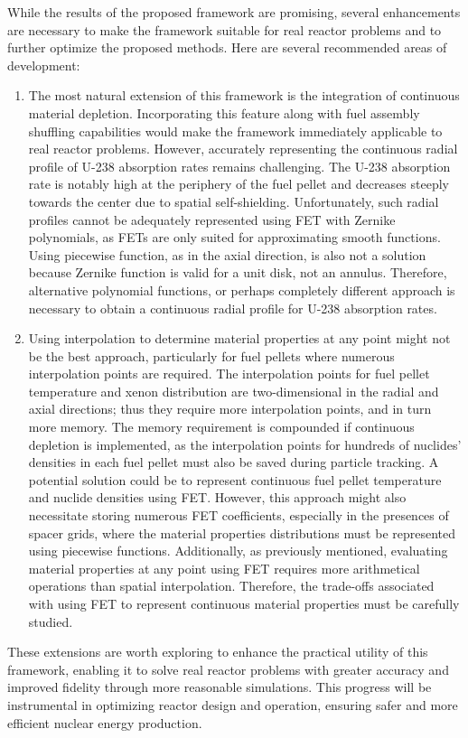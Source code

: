 While the results of the proposed framework are promising, several enhancements are necessary to make the framework suitable for real reactor problems and to further optimize the proposed methods. Here are several recommended areas of development:
\begin{enumerate}
    \item The most natural extension of this framework is the integration of continuous material depletion. Incorporating this feature along with fuel assembly shuffling capabilities would make the framework immediately applicable to real reactor problems. However, accurately representing the continuous radial profile of U-238 absorption rates remains challenging. The U-238 absorption rate is notably high at the periphery of the fuel pellet and decreases steeply towards the center due to spatial self-shielding. Unfortunately, such radial profiles cannot be adequately represented using FET with Zernike polynomials, as FETs are only suited for approximating smooth functions. Using piecewise function, as in the axial direction, is also not a solution because Zernike function is valid for a unit disk, not an annulus. Therefore, alternative polynomial functions, or perhaps completely different approach is necessary to obtain a continuous radial profile for U-238 absorption rates.

    \item Using interpolation to determine material properties at any point  might not be the best approach, particularly for fuel pellets where numerous interpolation points are required. The interpolation points for fuel pellet temperature and xenon distribution are two-dimensional in the radial and axial directions; thus they require more interpolation points, and in turn more memory. The memory requirement is compounded if continuous depletion is implemented, as the interpolation points for hundreds of nuclides' densities in each fuel pellet must also be saved during particle tracking. A potential solution could be to represent continuous fuel pellet temperature and nuclide densities using FET. However, this approach might also necessitate storing numerous FET coefficients, especially in the presences of spacer grids, where the material properties distributions must be represented using piecewise functions. Additionally, as previously mentioned, evaluating material properties at any point using FET requires more arithmetical operations than spatial interpolation. Therefore, the trade-offs associated with using FET to represent continuous material properties must be carefully studied.
\end{enumerate}

These extensions are worth exploring to enhance the practical utility of this framework, enabling it to solve real reactor problems with greater accuracy and improved fidelity through more reasonable simulations. This progress will be instrumental in optimizing reactor design and operation, ensuring safer and more efficient nuclear energy production.